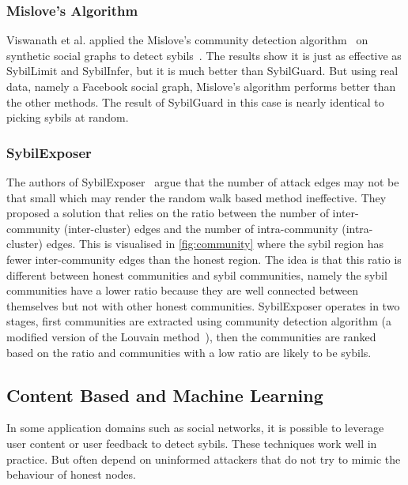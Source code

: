 \subsubsection{Mislove's Algorithm}
Viswanath et al. applied the Mislove's community detection
algorithm~\cite{mislove2010you} on synthetic social graphs to detect
sybils~\cite{viswanath2010analysis}. The results show it is just as effective as
SybilLimit and SybilInfer, but it is much better than SybilGuard. But using real
data, namely a Facebook social graph, Mislove's algorithm performs better than
the other methods. The result of SybilGuard in this case is nearly identical to
picking sybils at random.

\subsubsection{SybilExposer}
The authors of SybilExposer~\cite{misra2016sybilexposer} argue that the number
of attack edges may not be that small which may render the random walk based
method ineffective. They proposed a solution that relies on the ratio between
the number of inter-community (inter-cluster) edges and the number of
intra-community (intra-cluster) edges. This is visualised in
\autoref{fig:community} where the sybil region has fewer
inter-community edges than the honest region. The idea is that this ratio is
different between honest communities and sybil communities, namely the sybil
communities have a lower ratio because they are well connected between
themselves but not with other honest communities. SybilExposer operates in two
stages, first communities are extracted using community detection algorithm (a
modified version of the Louvain method~\cite{blondel2008fast}), then the
communities are ranked based on the ratio and communities with a low ratio are
likely to be sybils.


\subsection{Content Based and Machine Learning}
\label{sec:content-based}
In some application domains such as social networks, it is possible to leverage
user content or user feedback to detect sybils. These techniques work well in
practice. But often depend on uninformed attackers that do not try to mimic the
behaviour of honest nodes.

